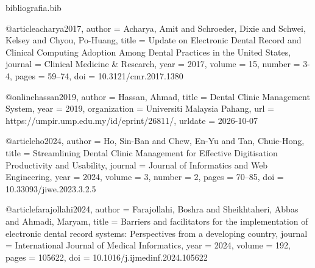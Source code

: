 %
%
%
%
%
%



\begin{filecontents*}{bibliografia.bib}
	
	@article{acharya2017,
		author  = {Acharya, Amit and Schroeder, Dixie and Schwei, Kelsey and Chyou, Po-Huang},
		title   = {Update on Electronic Dental Record and Clinical Computing Adoption Among Dental Practices in the United States},
		journal = {Clinical Medicine \& Research},
		year    = {2017},
		volume  = {15},
		number  = {3-4},
		pages   = {59--74},
		doi     = {10.3121/cmr.2017.1380}
	}
	
	@online{hassan2019,
		author       = {Hassan, Ahmad},
		title        = {Dental Clinic Management System},
		year         = {2019},
		organization = {Universiti Malaysia Pahang},
		url          = {https://umpir.ump.edu.my/id/eprint/26811/},
		urldate      = {2026-10-07}
	}
	
	@article{ho2024,
		author  = {Ho, Sin-Ban and Chew, En-Yu and Tan, Chuie-Hong},
		title   = {Streamlining Dental Clinic Management for Effective Digitisation Productivity and Usability},
		journal = {Journal of Informatics and Web Engineering},
		year    = {2024},
		volume  = {3},
		number  = {2},
		pages   = {70--85},
		doi     = {10.33093/jiwe.2023.3.2.5}
	}
	
	@article{farajollahi2024,
		author  = {Farajollahi, Boshra and Sheikhtaheri, Abbas and Ahmadi, Maryam},
		title   = {Barriers and facilitators for the implementation of electronic dental record systems: Perspectives from a developing country},
		journal = {International Journal of Medical Informatics},
		year    = {2024},
		volume  = {192},
		pages   = {105622},
		doi     = {10.1016/j.ijmedinf.2024.105622}
	}
	
\end{filecontents*}


